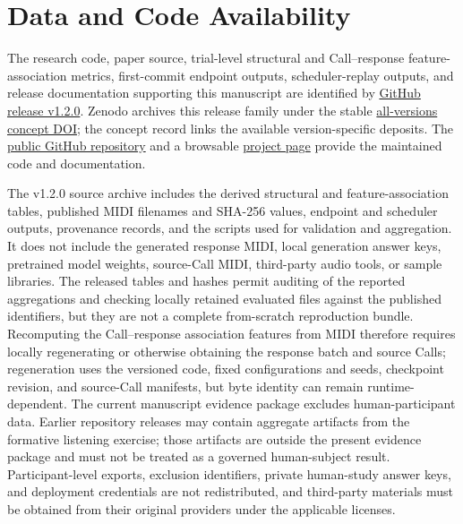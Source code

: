 \documentclass[11pt,a4paper]{article}
\begin{document}
\section*{Data and Code Availability}
\label{sec:data-code-availability}

The research code, paper source, trial-level structural and Call--response feature-association metrics, first-commit endpoint outputs, scheduler-replay outputs, and release documentation supporting this manuscript are identified by \href{https://github.com/MickeyWzt/real-time-midi-call-response/releases/tag/v1.2.0}{GitHub release v1.2.0}. Zenodo archives this release family under the stable \href{https://doi.org/10.5281/zenodo.20838083}{all-versions concept DOI}; the concept record links the available version-specific deposits. The \href{https://github.com/MickeyWzt/real-time-midi-call-response}{public GitHub repository} and a browsable \href{https://mickeywzt.github.io/real-time-midi-call-response/}{project page} provide the maintained code and documentation.

The v1.2.0 source archive includes the derived structural and feature-association tables, published MIDI filenames and SHA-256 values, endpoint and scheduler outputs, provenance records, and the scripts used for validation and aggregation. It does not include the generated response MIDI, local generation answer keys, pretrained model weights, source-Call MIDI, third-party audio tools, or sample libraries. The released tables and hashes permit auditing of the reported aggregations and checking locally retained evaluated files against the published identifiers, but they are not a complete from-scratch reproduction bundle. Recomputing the Call--response association features from MIDI therefore requires locally regenerating or otherwise obtaining the response batch and source Calls; regeneration uses the versioned code, fixed configurations and seeds, checkpoint revision, and source-Call manifests, but byte identity can remain runtime-dependent. The current manuscript evidence package excludes human-participant data. Earlier repository releases may contain aggregate artifacts from the formative listening exercise; those artifacts are outside the present evidence package and must not be treated as a governed human-subject result. Participant-level exports, exclusion identifiers, private human-study answer keys, and deployment credentials are not redistributed, and third-party materials must be obtained from their original providers under the applicable licenses.
\end{document}
